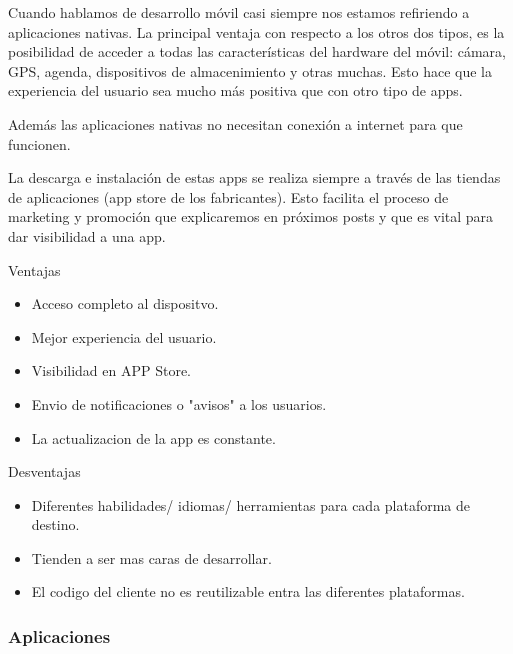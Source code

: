 Cuando hablamos de desarrollo móvil casi siempre nos estamos refiriendo a aplicaciones nativas. La principal ventaja con respecto a los otros dos tipos, es la posibilidad de acceder a todas las características del hardware del móvil: cámara, GPS, agenda, dispositivos de almacenimiento y otras muchas. Esto hace que la experiencia del usuario sea mucho más positiva que con otro tipo de apps.

Además las aplicaciones nativas no necesitan conexión a internet para que funcionen.

La descarga e instalación de estas apps se realiza siempre a través de las tiendas de aplicaciones (app store de los fabricantes). Esto facilita el proceso de marketing y promoción que explicaremos en próximos posts y que es vital para dar visibilidad a una app.

Ventajas

\begin{itemize}

	\item Acceso completo al dispositvo. 
	
	\item Mejor experiencia del usuario. 
	
	\item Visibilidad en APP Store.
	
	\item Envio de notificaciones o "avisos" a los usuarios.
	
	\item La actualizacion de la app es constante.
	
\end{itemize}

Desventajas

\begin{itemize}

	\item Diferentes habilidades/ idiomas/ herramientas para cada plataforma de destino.

	\item Tienden a ser mas caras de desarrollar. 

	\item El codigo del cliente no es reutilizable entra las diferentes plataformas.
	
\end{itemize}

\subsubsection{Aplicaciones}

